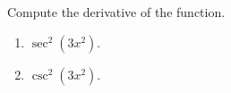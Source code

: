 Compute the derivative of the function.
\begin{enumerate}
\item $\sec^2 (3x^2)$. 
\item $\csc^2 (3x^2)$. 
\end{enumerate}